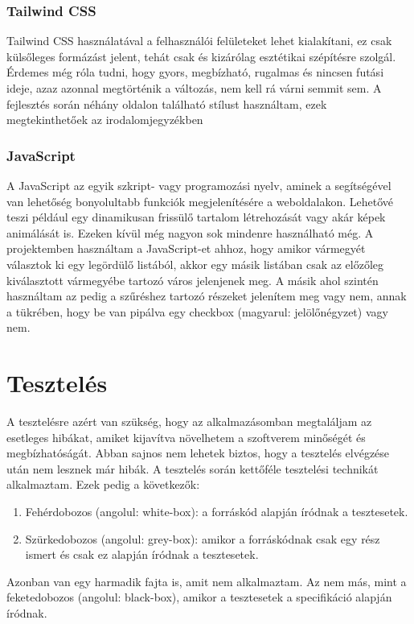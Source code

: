 \documentclass[]{thesis-ekf}
\theoremstyle{definition}
\theoremstyle{remark}
\begin{document}
	\subsection{Tailwind CSS}\label{sc-tailwind}
		Tailwind CSS használatával a felhasználói felületeket lehet kialakítani, ez csak külsőleges formázást jelent, tehát csak és kizárólag esztétikai szépítésre szolgál. Érdemes még róla tudni, hogy gyors, megbízható, rugalmas és nincsen futási ideje, azaz azonnal megtörténik a változás, nem kell rá várni semmit sem. A fejlesztés során néhány oldalon található stílust használtam, ezek megtekinthetőek az irodalomjegyzékben \cite{tailwind, FlowBite}
	\subsection{JavaScript}\label{javascript}
		A JavaScript az egyik szkript- vagy programozási nyelv, aminek a segítségével van lehetőség bonyolultabb funkciók megjelenítésére a weboldalakon. Lehetővé teszi például egy dinamikusan frissülő tartalom létrehozását vagy akár képek animálását is. Ezeken kívül még nagyon sok mindenre használható még. A projektemben használtam a JavaScript-et ahhoz, hogy amikor vármegyét választok ki egy legördülő listából, akkor egy másik listában csak az előzőleg kiválasztott vármegyébe tartozó város jelenjenek meg. A másik ahol szintén használtam az pedig a szűréshez tartozó részeket jelenítem meg vagy nem, annak a tükrében, hogy be van pipálva egy checkbox (magyarul: jelölőnégyzet) vagy nem.
		
	\chapter{Tesztelés}
		A tesztelésre azért van szükség, hogy az alkalmazásomban megtaláljam az esetleges hibákat, amiket kijavítva növelhetem a szoftverem minőségét és megbízhatóságát. Abban sajnos nem lehetek biztos, hogy a tesztelés elvégzése után nem lesznek már hibák. A tesztelés során kettőféle tesztelési technikát alkalmaztam. Ezek pedig a következők:
		\begin{enumerate}
			\item Fehérdobozos (angolul: white-box): a forráskód alapján íródnak a tesztesetek.
			\item Szürkedobozos (angolul: grey-box): amikor a forráskódnak csak egy rész ismert és csak ez alapján íródnak a tesztesetek.
		\end{enumerate}
		Azonban van egy harmadik fajta is, amit nem alkalmaztam. Az nem más, mint a feketedobozos (angolul: black-box), amikor a tesztesetek a specifikáció alapján íródnak.
		\cite[26-29.~oldal]{Kusper}
\end{document}
